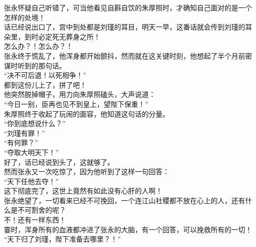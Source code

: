\begin{multicols}{\theparacolNo}
张永怀疑自己听错了，可当他看见自斟自饮的朱厚照时，才确知自己面对的是一个怎样的处境！\\

话已经说出口了，宫中到处都是刘瑾的耳目，明天一早，这番话就会传到刘瑾的耳朵里，到时必定死无葬身之所！\\

怎么办？！怎么办？！\\

张永终于慌乱了，他浑身都开始颤抖，然而就在这关键时刻，他想起了半个月前密谋时听到的那句话。\\

“决不可后退！以死相争！”\\

都到这份儿上了，拼了吧！\\

他突然脱掉帽子，用力向朱厚照磕头，大声说道：\\

“今日一别，臣再也见不到皇上，望陛下保重！”\\

朱厚照终于收起了玩闹的面容，他知道这句话的分量。\\

“你到底想说什么？”\\

“刘瑾有罪！”\\

“有何罪？”\\

“夺取大明天下！”\\

好了，话已经说到头了，这就够了。\\

然而张永又一次吃惊了，因为他听到了这样一句回答：\\

“天下任他去夺！”\\

这下彻底完了，这世上竟然有如此没有心肝的人啊！\\

张永绝望了，一切看来已经不可挽回，一个连江山社稷都不放在心上的人，还有什么是不可割舍的呢？\\

不！还有一样东西！\\

霎时，浑身所有的血液都冲进了张永的大脑，有一个回答，可以挽救所有的一切！\\

“天下归了刘瑾，陛下准备去哪里？！”\\


\end{multicols}
